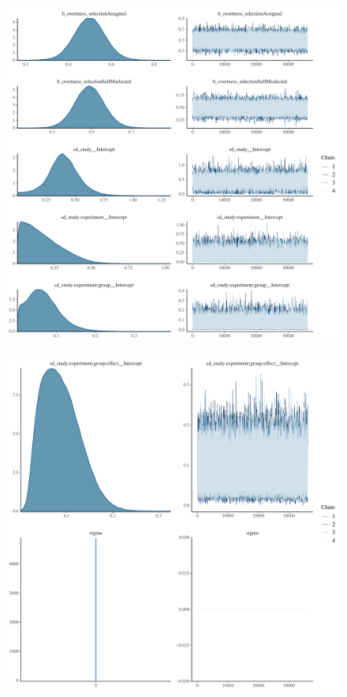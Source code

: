 \documentclass[
]{report}
\begin{document}
\begin{figure}

{\centering \includegraphics[width=1\textwidth,height=\textheight]{diagnostic_plots_files/figure-pdf/unnamed-chunk-23-1.pdf}

}

\end{figure}

\begin{figure}

{\centering \includegraphics[width=1\textwidth,height=\textheight]{diagnostic_plots_files/figure-pdf/unnamed-chunk-23-2.pdf}

}

\end{figure}
\end{document}
